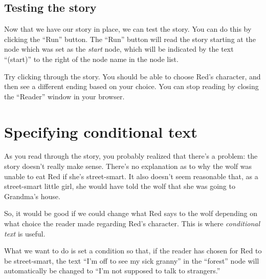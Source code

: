 \documentclass{article}
\begin{document}
\subsection{Testing the story}

Now that we have our story in place, we can test the story. You can do this by
clicking the ``Run'' button. The ``Run'' button will read the story starting at
the node which was set as the \textit{start} node, which will be indicated by the
text ``(start)'' to the right of the node name in the node list.

Try clicking through the story. You should be able to choose Red's character, and
then see a different ending based on your choice. You can stop reading by closing
the ``Reader'' window in your browser.

\section{Specifying conditional text}

As you read through the story, you probably realized that there's a problem:
the story doesn't really make sense. There's no explanation as to why the wolf
was unable to eat Red if she's street-smart. It also doesn't seem reasonable
that, as a street-smart little girl, she would have told the wolf that she was
going to Grandma's house.

So, it would be good if we could change what Red says to the wolf depending on
what choice the reader made regarding Red's character. This is where
\textit{conditional text} is useful.

What we want to do is set a condition so that, if the reader has chosen for
Red to be street-smart, the text ``I'm off to see my sick granny'' in the
``forest'' node will automatically be changed to ``I'm not supposed to talk to
strangers.''
\end{document}
